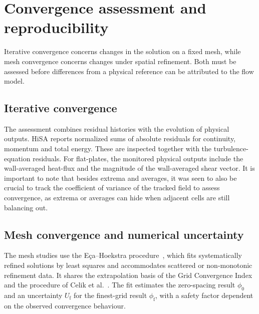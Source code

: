 \section{Convergence assessment and reproducibility}
\label{sec:numerical-framework:convergence}

Iterative convergence concerns changes in the solution on a fixed mesh, while
mesh convergence concerns changes under spatial refinement. Both must be
assessed before differences from a physical reference can be attributed to
the flow model.

\subsection{Iterative convergence}

The assessment combines residual histories with the evolution of physical
outputs. HiSA reports normalized sums of absolute residuals for continuity,
momentum and total energy. These are inspected together with the
turbulence-equation residuals. For flat-plates, the monitored physical outputs include the
wall-averaged heat-flux and the magnitude of the wall-averaged shear vector. It is important to note that besides extrema and averages, it was seen to also be crucial to track the coefficient of variance of the tracked field to assess convergence, as extrema or averages can hide when adjacent cells are still balancing out.

\subsection{Mesh convergence and numerical uncertainty}

The mesh studies use the E\c{c}a--Hoekstra
procedure~\citep{EcaHoekstra2014NumericalUncertainty}, which fits systematically
refined solutions by least squares and accommodates scattered or
non-monotonic refinement data. It shares the extrapolation basis of the
Grid Convergence Index~\citep{Roache1994GridRefinement} and the procedure of
Celik et al.~\citep{Celik2008DiscretizationUncertainty}.
The fit estimates the zero-spacing result \(\phi_0\) and an uncertainty
\(U_{\mathrm f}\) for the finest-grid result \(\phi_{\mathrm f}\), with a
safety factor dependent on the observed convergence behaviour.
\par\medskip

